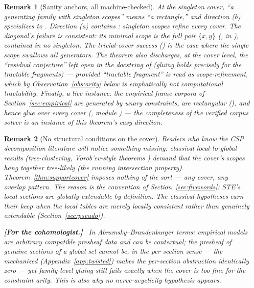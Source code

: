 \documentclass[11pt]{article}
\newtheorem{remark}{Remark}
\newenvironment{cohomaside}
  {\par\medskip\noindent\begingroup\small
   \textbf{[For the cohomologist.]}\ }
  {\endgroup\par\medskip}
\begin{document}
\begin{remark}[Sanity anchors, all machine-checked]
At the singleton cover, ``a generating family with singleton scopes''
means ``a rectangle,'' and direction (b) specializes to
.  Direction (a) contains
: singleton scopes refine
\emph{every} cover.  The diagonal's failure is consistent: its
minimal scope is the full pair $\{x,y\}$
(, in ), contained in
no singleton.  The trivial-cover success
() is the case where the single scope
swallows all generators.  The theorem also discharges, at the cover
level, the ``residual conjecture'' left open in the docstring of
 (gluing holds precisely for the tractable
fragments) --- provided ``tractable fragment'' is read as
\emph{scope-refinement}, which by Observation~\ref{obs:arity} below
is emphatically \emph{not} computational tractability.  Finally, a
live instance: the empirical frame corpora of
Section~\ref{sec:empirical} are generated by unary constraints, are
rectangular (), and hence
glue over \emph{every} cover (, module
) --- the completeness of the verified
corpus solver is an instance of this theorem's easy direction.
\end{remark}

\begin{remark}[No structural conditions on the cover]
Readers who know the CSP decomposition literature will notice
something missing: classical local-to-global results
(tree-clustering, Vorob'ev-style theorems
\citep{dechterpearl1989tree,freuder1982backtrack}) demand that the
cover's scopes hang together tree-likely (the running intersection
property).  Theorem~\ref{thm:supportcover} imposes nothing of the
sort --- any cover, any overlap pattern.  The reason is the
convention of Section~\ref{sec:fivewords}: STE's local sections are
\emph{globally extendable by definition}.  The classical hypotheses
earn their keep when the local tables are merely \emph{locally}
consistent rather than genuinely extendable
(Section~\ref{sec:pseudo}).
\begin{cohomaside}
In Abramsky--Brandenburger terms: empirical models are arbitrary
compatible presheaf data and can be contextual; the presheaf of
genuine sections of a global set cannot be, in the per-section sense
--- the mechanized 
(Appendix~\ref{app:twisted}) makes the per-section obstruction
identically zero --- yet family-level gluing still fails exactly when
the cover is too fine for the constraint arity.  This is also why no
nerve-acyclicity hypothesis appears.
\end{cohomaside}
\end{remark}
\end{document}
